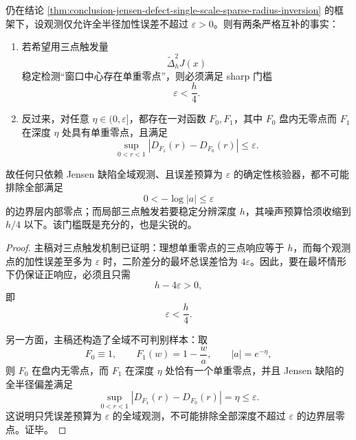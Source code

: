 \begin{theorem}\label{thm:conclusion-jensen-defect-sharp-boundary-layer-obstruction}
仍在结论 \ref{thm:conclusion-jensen-defect-single-scale-sparse-radius-inversion} 的框架下，设观测仅允许全半径加性误差不超过 \(\varepsilon>0\)。则有两条严格互补的事实：
\begin{enumerate}
  \item 若希望用三点触发量
  \[
  \widetilde\Delta_h^2J(x)
  \]
  稳定检测“窗口中心存在单重零点”，则必须满足 sharp 门槛
  \[
  \varepsilon<\frac h4.
  \]
  \item 反过来，对任意 \(\eta\in(0,\varepsilon]\)，都存在一对函数 \(F_0,F_1\)，其中 \(F_0\) 盘内无零点而 \(F_1\) 在深度 \(\eta\) 处具有单重零点，且满足
  \[
  \sup_{0<r<1}|D_{F_1}(r)-D_{F_0}(r)|\le \varepsilon.
  \]
\end{enumerate}
故任何只依赖 Jensen 缺陷全域观测、且误差预算为 \(\varepsilon\) 的确定性核验器，都不可能排除全部满足
\[
0<-\log|a|\le \varepsilon
\]
的边界层内部零点；而局部三点触发若要稳定分辨深度 \(h\)，其噪声预算恰须收缩到 \(h/4\) 以下。该门槛既是充分的，也是尖锐的。
\end{theorem}
\begin{proof}
主稿对三点触发机制已证明：理想单重零点的三点响应等于 \(h\)，而每个观测点的加性误差至多为 \(\varepsilon\) 时，二阶差分的最坏总误差恰为 \(4\varepsilon\)。因此，要在最坏情形下仍保证正响应，必须且只需
\[
h-4\varepsilon>0,
\]
即
\[
\varepsilon<\frac h4.
\]

另一方面，主稿还构造了全域不可判别样本：取
\[
F_0\equiv 1,
\qquad
F_1(w)=1-\frac{w}{a},
\qquad
|a|=e^{-\eta},
\]
则 \(F_0\) 在盘内无零点，而 \(F_1\) 在深度 \(\eta\) 处恰有一个单重零点，并且 Jensen 缺陷的全半径偏差满足
\[
\sup_{0<r<1}|D_{F_1}(r)-D_{F_0}(r)|=\eta\le \varepsilon.
\]
这说明只凭误差预算为 \(\varepsilon\) 的全域观测，不可能排除全部深度不超过 \(\varepsilon\) 的边界层零点。证毕。
\end{proof}
